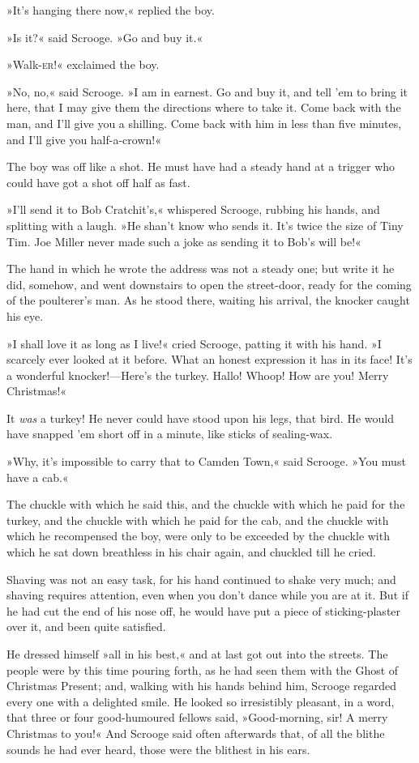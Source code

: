 »It's hanging there now,« replied the boy.

»Is it?« said Scrooge. »Go and buy it.«

»Walk-\textsc{er}!« exclaimed the boy.

»No, no,« said Scrooge. »I am in earnest. Go and buy it, and tell 'em to bring it here, that I may give them the directions where to take it. Come back with the man, and I'll give you a shilling. Come back with him in less than five minutes, and I'll give you half-a-crown!«

The boy was off like a shot. He must have had a steady hand at a trigger who could have got a shot off half as fast.

»I'll send it to Bob Cratchit's,« whispered Scrooge, rubbing his hands, and splitting with a laugh. »He shan't know who sends it. It's twice the size of Tiny Tim. Joe Miller never made such a joke as sending it to Bob's will be!«

The hand in which he wrote the address was not a steady one; but write it he did, somehow, and went downstairs to open the street-door, ready for the coming of the poulterer's man. As he stood there, waiting his arrival, the knocker caught his eye.

»I shall love it as long as I live!« cried Scrooge, patting it with his hand. »I scarcely ever looked at it before. What an honest expression it has in its face! It's a wonderful knocker!---Here's the turkey. Hallo! Whoop! How are you! Merry Christmas!«

It \textit{was} a turkey! He never could have stood upon his legs, that bird. He would have snapped 'em short off in a minute, like sticks of sealing-wax.

»Why, it's impossible to carry that to Camden Town,« said Scrooge. »You must have a cab.«

The chuckle with which he said this, and the chuckle with which he paid for the turkey, and the chuckle with which he paid for the cab, and the chuckle with which he recompensed the boy, were only to be exceeded by the chuckle with which he sat down breathless in his chair again, and chuckled till he cried.

Shaving was not an easy task, for his hand continued to shake very much; and shaving requires attention, even when you don't dance while you are at it. But if he had cut the end of his nose off, he would have put a piece of sticking-plaster over it, and been quite satisfied.

He dressed himself »all in his best,« and at last got out into the streets. The people were by this time pouring forth, as he had seen them with the Ghost of Christmas Present; and, walking with his hands behind him, Scrooge regarded every one with a delighted smile. He looked so irresistibly pleasant, in a word, that three or four good-humoured fellows said, »Good-morning, sir! A merry Christmas to you!« And Scrooge said often afterwards that, of all the blithe sounds he had ever heard, those were the blithest in his ears.

